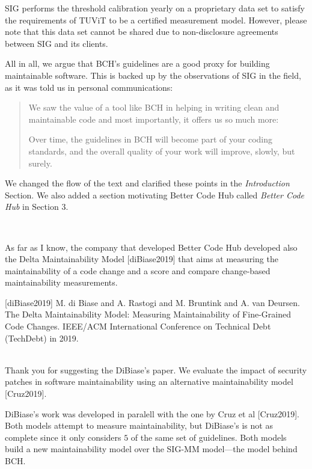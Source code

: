 \documentclass[11pt,fleqn]{article}
\newcommand{\eline}{\vspace*{.75\baselineskip}}
\newcommand{\Referee}[1]{\eline \noindent {\bf Reviewer comment #1:} \\}
\newcommand{\Us}{\eline \noindent {\bf Response:}\\}
\newenvironment{revcomment}[1][]
{\Referee{#1}\begin{rcomment}}
{\end{rcomment}}
\begin{document}
SIG performs the threshold calibration
yearly on a proprietary data set to satisfy the requirements of TUViT to
be a certified measurement model. However, please note that this data set 
cannot be shared due to non-disclosure agreements between SIG and its 
clients.

All in all, we argue that BCH's guidelines are a good proxy for building maintainable software. This is 
backed up by the observations of SIG in the field, as it was told us in personal communications: 

\begin{quote}
We saw the value of a tool like BCH in helping in writing clean and maintainable code and most importantly, 
it offers us so much more:

Over time, the guidelines in BCH will become part of your coding standards, and the overall quality of your 
work will improve, slowly, but surely.
\end{quote}

We changed the flow of the text and clarified these points in the \emph{Introduction} Section. We also 
added a section motivating Better Code Hub called \emph{Better Code Hub} in Section $3$.

\begin{revcomment}[1.2]

    As far as I know, the company that developed Better Code Hub 
    developed also the Delta Maintainability Model [diBiase2019] 
    that aims at measuring the maintainability of a code change 
    and a score and compare change-based maintainability measurements.

    [diBiase2019] M. di Biase and A. Rastogi and M. Bruntink and A. van 
    Deursen. The Delta Maintainability Model: Measuring Maintainability 
    of Fine-Grained Code Changes. IEEE/ACM International Conference 
    on Technical Debt (TechDebt) in 2019.

\end{revcomment}

\Us Thank you for suggesting the DiBiase's paper. 
We evaluate the impact of security patches in software 
maintainability using an alternative maintainability model [Cruz2019]. 

DiBiase's work was developed in paralell with the one by Cruz et al [Cruz2019]. 
Both models attempt to measure maintainability, but DiBiase's is not as complete 
since it only considers $5$ of the same set of guidelines. Both models build a 
new maintainability model over the SIG-MM model---the model behind BCH. 
\end{document}
